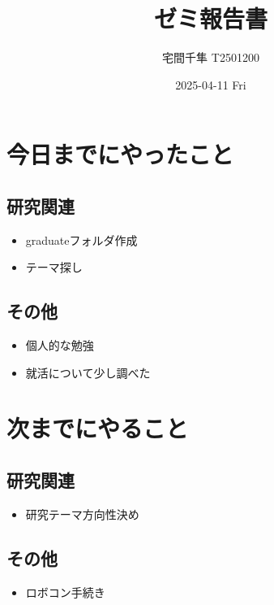 \documentclass[10pt]{article}
\title{\vspace{-20mm}\bf{\LARGE{ゼミ報告書}}}
\author{\vspace{-10mm}宅間千隼 T2501200}
\date{2025-04-11 Fri}
\begin{document}
\maketitle

\section{今日までにやったこと}

\subsection*{研究関連} 
\begin{itemize}
        \item graduateフォルダ作成
	\item テーマ探し
\end{itemize}

\subsection*{その他}
\begin{itemize}
	\item 個人的な勉強
        \item  就活について少し調べた
\end{itemize}

\section{次までにやること}

\subsection*{研究関連}
\begin{itemize}
	\item 研究テーマ方向性決め
\end{itemize}

\subsection*{その他}
\begin{itemize}
    \item ロボコン手続き
\end{itemize}
\end{document}
